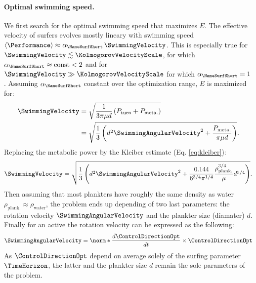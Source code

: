 \paragraph{Optimal swimming speed.}
We first search for the optimal swimming speed that maximizes $E$.
The effective velocity of surfers evolves mostly lineary with swimming speed $\left\langle \Performance \right\rangle \approx \alpha_{\mathrm{\NameSurfShort}} \, \SwimmingVelocity$.
This is especially true for $\SwimmingVelocity \lesssim \KolmogorovVelocityScale$, for which $\alpha_{\mathrm{\NameSurfShort}} \approx \mathrm{const} < 2$ and for $\SwimmingVelocity \gg \KolmogorovVelocityScale$ for which $\alpha_{\mathrm{\NameSurfShort}} = 1$.
Assuming $\alpha_{\mathrm{\NameSurfShort}}$ constant over the optimization range, $E$ is maximized for:
\begin{align}
	\SwimmingVelocity &= \sqrt{\frac{1}{3 \pi \mu d} \left( P_{\mathrm{turn}} + P_{\mathrm{meta.}} \right)} \\
	&= \sqrt{\frac{1}{3} \left(d^2 \SwimmingAngularVelocity^2 + \frac{P_{\mathrm{meta.}}}{\pi\mu d} \right)}.
\end{align}
Replacing the metabolic power by the Kleiber estimate (Eq. \eqref{eq:kleiber}):
\begin{equation}
	\SwimmingVelocity = \sqrt{\frac{1}{3} \left(d^2 \SwimmingAngularVelocity^2 + \frac{0.144}{6^{3/4} \pi^{1/4}} \frac{\rho_{\mathrm{plank.}}^{3/4}}{\mu} d^{5/4} \right)}.
\end{equation}
Then assuming that most plankters have roughly the same density as water $\rho_{\mathrm{plank.}} \approx \rho_{\mathrm{water}}$, the problem ends up depending of two last parameters: the rotation velocity $\SwimmingAngularVelocity$ and the plankter size (diamater) $d$.
Finally for an active the rotation velocity can be expressed as the following:
\begin{equation}
	\SwimmingAngularVelocity = \norm*{\frac{d \ControlDirectionOpt}{dt} \times \ControlDirectionOpt}
\end{equation}
As $\ControlDirectionOpt$ depend on average solely of the surfing parameter $\TimeHorizon$, the latter and the plankter size $d$ remain the sole parameters of the problem.



